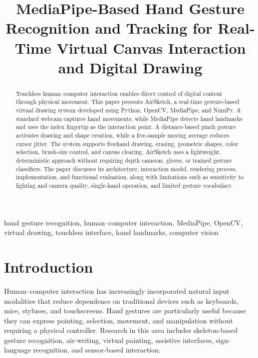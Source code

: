 \documentclass[conference]{IEEEtran}
\begin{document}
\title{MediaPipe-Based Hand Gesture Recognition and Tracking for Real-Time Virtual Canvas Interaction and Digital Drawing}

\author{
}

\maketitle

\begin{abstract}
Touchless human–computer interaction enables direct control of digital content through physical movement. This paper presents AirSketch, a real-time gesture-based virtual drawing system developed using Python, OpenCV, MediaPipe, and NumPy. A standard webcam captures hand movements, while MediaPipe detects hand landmarks and uses the index fingertip as the interaction point. A distance-based pinch gesture activates drawing and shape creation, while a five-sample moving average reduces cursor jitter. The system supports freehand drawing, erasing, geometric shapes, color selection, brush-size control, and canvas clearing. AirSketch uses a lightweight, deterministic approach without requiring depth cameras, gloves, or trained gesture classifiers. The paper discusses its architecture, interaction model, rendering process, implementation, and functional evaluation, along with limitations such as sensitivity to lighting and camera quality, single-hand operation, and limited gesture vocabulary.
\end{abstract}

\begin{IEEEkeywords}
hand gesture recognition, human--computer interaction, MediaPipe, OpenCV, virtual drawing, touchless interface, hand landmarks, computer vision
\end{IEEEkeywords}

\section{Introduction}

Human--computer interaction has increasingly incorporated natural input modalities that reduce dependence on traditional devices such as keyboards, mice, styluses, and touchscreens. Hand gestures are particularly useful because they can express pointing, selection, movement, and manipulation without requiring a physical controller. Research in this area includes skeleton-based gesture recognition, air-writing, virtual painting, assistive interfaces, sign-language recognition, and sensor-based interaction.
\end{document}

